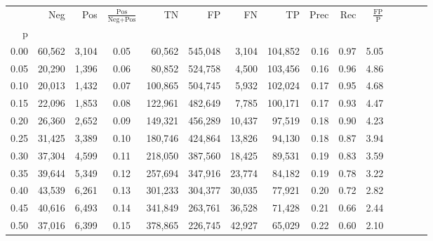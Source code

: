 \begin{tabular}{rrrcrrrrrrrrrrr}
\toprule
{} &     Neg &     Pos & $\frac{\text{Pos}}{\text{Neg}+\text{Pos}}$ &       TN &       FP &       FN &       TP &  Prec &   Rec & $\frac{\text{FP}}{\text{P}}$ \\
p    &         &         &                                            &          &          &          &          &       &       &                              \\
\midrule
0.00 &  60,562 &   3,104 &                                       0.05 &   60,562 &  545,048 &    3,104 &  104,852 &  0.16 &  0.97 &                         5.05 \\
0.05 &  20,290 &   1,396 &                                       0.06 &   80,852 &  524,758 &    4,500 &  103,456 &  0.16 &  0.96 &                         4.86 \\
0.10 &  20,013 &   1,432 &                                       0.07 &  100,865 &  504,745 &    5,932 &  102,024 &  0.17 &  0.95 &                         4.68 \\
0.15 &  22,096 &   1,853 &                                       0.08 &  122,961 &  482,649 &    7,785 &  100,171 &  0.17 &  0.93 &                         4.47 \\
0.20 &  26,360 &   2,652 &                                       0.09 &  149,321 &  456,289 &   10,437 &   97,519 &  0.18 &  0.90 &                         4.23 \\
0.25 &  31,425 &   3,389 &                                       0.10 &  180,746 &  424,864 &   13,826 &   94,130 &  0.18 &  0.87 &                         3.94 \\
0.30 &  37,304 &   4,599 &                                       0.11 &  218,050 &  387,560 &   18,425 &   89,531 &  0.19 &  0.83 &                         3.59 \\
0.35 &  39,644 &   5,349 &                                       0.12 &  257,694 &  347,916 &   23,774 &   84,182 &  0.19 &  0.78 &                         3.22 \\
0.40 &  43,539 &   6,261 &                                       0.13 &  301,233 &  304,377 &   30,035 &   77,921 &  0.20 &  0.72 &                         2.82 \\
0.45 &  40,616 &   6,493 &                                       0.14 &  341,849 &  263,761 &   36,528 &   71,428 &  0.21 &  0.66 &                         2.44 \\
0.50 &  37,016 &   6,399 &                                       0.15 &  378,865 &  226,745 &   42,927 &   65,029 &  0.22 &  0.60 &                         2.10 \\

\end{tabular}
